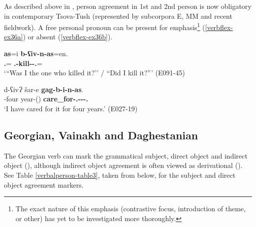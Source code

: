 As described above in , person agreement in 1st and 2nd person is now obligatory in contemporary Tsova-Tush (represented by subcorpora E, MM and recent fieldwork). A free personal pronoun can be present for emphasis\footnote{The exact nature of this emphasis (contrastive focus, introduction of theme, or other) has yet to be investigated more thoroughly.} (\ref{verbflex-ex36a}) or absent (\ref{verbflex-ex36b}).

\begin{exe}
	\ex\label{verbflex-ex36}
	\begin{xlist}
		
		
			\ex\label{verbflex-ex36a}
			\gll \textbf{as}=i \textbf{b-ʕiv-n-as}=en. \\
			\textbf{{\Fsg}.{\Erg}}={\Q} \textbf{{\B}.{\Sg}-kill-{\Aor}-{\Fsg}.{\Erg}}={\Quot} \\
			\trans `{``}Was I the one who killed it?'' / ``Did I kill it?{''}'
			\hfill (E091-45)
		
		
		
			\ex\label{verbflex-ex36b}
			\gll d-ʕivɁ šar-e \textbf{gag-b-i-n-as}. \\
			{\D}-four year-{\Obl}({\Ess}) \textbf{care\_for-{\B}.{\Sg}-{\Tr}-{\Aor}-{\Fsg}.{\Erg}} \\
			\trans `I have cared for it for four years.'
			\hfill (E027-19)
		
		
	\end{xlist}
\end{exe}

\subsection{Georgian, Vainakh and Daghestanian}

The Georgian verb can mark the grammatical subject, direct object and indirect object (\cite[244--247]{aronson91}), although indirect object agreement is often viewed as derivational (\cite{gerardin2022valencegeo}). See Table \ref{verbalperson-table3}, taken from \textcite[85]{vogt} below, for the subject and direct object agreement markers.

